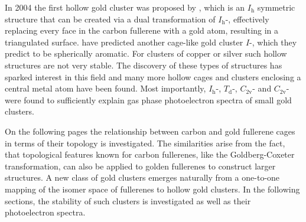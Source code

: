 In 2004 the first hollow gold cluster  was proposed by
\citeauthor{Johansson_Au3224CaratGolden_2004}\autocite{Johansson_Au3224CaratGolden_2004},
which is an $I_\text{h}$ symmetric structure that can be created via a dual
transformation of $I_\text{h}$-, effectively replacing every face in the
carbon fullerene with a gold atom, resulting in a triangulated surface.
\citeauthor{Karttunen_IcosahedralAu72_2008}\autocite{Karttunen_IcosahedralAu72_2008}
have predicted another cage-like gold cluster $I$-, which they predict
to be spherically aromatic. For clusters of copper or silver such hollow
structures are not very
stable.\autocite{Johansson_Au3224CaratGolden_2004,FERNANDEZ_DENSITYFUNCTIONALSTUDIES_2006}
The discovery of these types of structures has sparked interest in this field
and many more hollow
cages\autocite{Gu-2004,Fernandez-2006,Fa-Dong-2006,Fa-Zhou-2006,Karttunen_IcosahedralAu72_2008,Fa-Luong-2008,Chen_Structuresneutralanionic_2010,Tian-2011,De-2012,Ning-2014,Joshi-2015}
and clusters enclosing a central metal
atom\autocite{Autschbach_PropertiesWAu12_2004,Zhai-2004,Gao-Bulusu-2005,Wang_Dopinggoldencage_2007,Wang_DopingGoldenBuckyballs_2007,Fa-Dong-2008a,Munoz-2013,Manna-2013,Tang-2013}
have been found. Most importantly, $I_\text{h}$-,
$T_\text{d}$-, $C_\text{2v}$- and
$C_\text{2v}$- were found to sufficiently explain gas phase
photoelectron spectra of small gold clusters.\autocite{Ji-2005,Bulusu_Evidencehollowgolden_2006}

On the following pages the relationship between carbon and gold fullerene cages
in terms of their topology is investigated. The similarities arise from the
fact, that topological features known for carbon
fullerenes\autocite{Cataldo-Ori-2011,Schwerdtfeger_topologyfullerenes_2015,Fowler-atlas-2006},
like the Goldberg-Coxeter
transformation,\autocite{Goldberg_ClassMultiSymmetricPolyhedra_1937,Coxeter-1971}
can also be applied to golden fullerenes to construct larger structures. A new
class of gold clusters emerges naturally from a one-to-one mapping of the isomer
space of fullerenes to hollow gold clusters. In the following sections, the
stability of such clusters is investigated as well as their photoelectron
spectra. 


